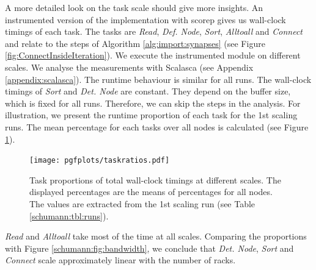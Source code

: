 A more detailed look on the task scale should give more insights.
An instrumented version of the implementation with scorep gives us wall-clock timings of each task.
The tasks are \emph{Read}, \emph{Def. Node}, \emph{Sort}, \emph{Alltoall} and \emph{Connect} and relate to the
steps of Algorithm \ref{alg:import:synapses} (see Figure \ref{fig:ConnectInsideIteration}).
We execute the instrumented module on different scales.
We analyse the measurements with Scalasca (see Appendix \ref{appendix:scalasca}).
The runtime behaviour is similar for all runs.
The wall-clock timings of \emph{Sort} and \emph{Det. Node} are constant.
They depend on the buffer size, which is fixed for all runs.
Therefore, we can skip the steps in the analysis.
For illustration, we present the runtime proportion of each task for the 1st scaling runs.
The mean percentage for each tasks over all nodes is calculated (see Figure \ref{schumann:fig:taskratios}).
\begin{figure}[h!]
\begin{center}
 \texttt{[image: pgfplots/taskratios.pdf]}
\end{center}
\caption[Task proportions of total wall-clock timings at different scales]{Task proportions of total wall-clock timings at different scales.
 The displayed percentages are the means of percentages for all nodes.
 The values are extracted from the 1st scaling run (see Table \ref{schumann:tbl:runs}).
 }
\label{schumann:fig:taskratios}
\end{figure}

\emph{Read} and \emph{Alltoall} take most of the time at all scales.
Comparing the proportions with Figure \ref{schumann:fig:bandwidth}, we conclude that
\emph{Det. Node}, \emph{Sort} and \emph{Connect} scale approximately linear with the number of racks.

